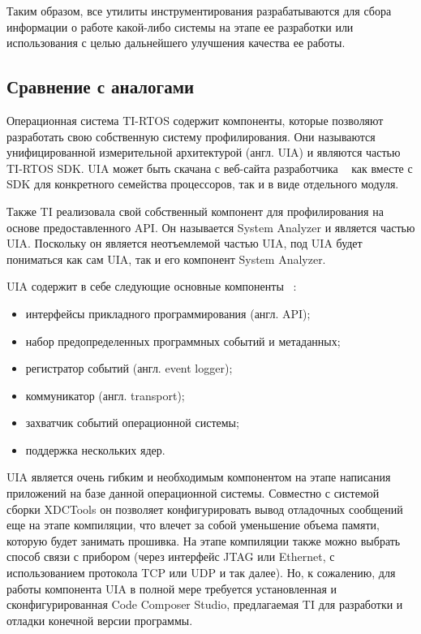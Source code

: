 Таким образом, все утилиты инструментирования разрабатываются для сбора
информации о работе какой-либо системы на этапе ее разработки или использования
с целью дальнейшего улучшения качества ее работы.

\subsection{Сравнение с аналогами}


Операционная система TI-RTOS содержит компоненты, которые позволяют
разработать свою собственную систему профилирования. Они называются
унифицированной измерительной архитектурой (англ. UIA) и являются частью
TI-RTOS SDK. UIA может быть скачана с веб-сайта разработчика ~\cite{uia_wiki}
как вместе с SDK для конкретного семейства процессоров, так и в виде отдельного
модуля.

Также TI реализовала свой собственный компонент для профилирования
на основе предоставленного API.
Он называется System Analyzer и является частью UIA.
Поскольку он является неотъемлемой частью UIA, под UIA будет пониматься
как сам UIA, так и его компонент System Analyzer.

UIA содержит в себе следующие основные компоненты ~\cite{sys_analyzer_doc}:
\begin{itemize}
    \item интерфейсы прикладного программирования (англ. API);
    \item набор предопределенных программных событий и метаданных;
    \item регистратор событий (англ. event logger);
    \item коммуникатор (англ. transport);
    \item захватчик событий операционной системы;
    \item поддержка нескольких ядер.
\end{itemize}


UIA является очень гибким и необходимым компонентом на этапе написания
приложений на базе данной операционной системы. Совместно с системой сборки
XDCTools он позволяет конфигурировать вывод отладочных сообщений еще на этапе
компиляции, что влечет за собой уменьшение объема памяти, которую будет
занимать прошивка. На этапе компиляции также можно выбрать способ связи с
прибором (через интерфейс JTAG или Ethernet, с использованием протокола TCP или
UDP и так далее). Но, к сожалению, для работы компонента UIA в полной мере
требуется установленная и сконфигурированная Code Composer Studio,
предлагаемая TI для разработки и отладки конечной версии программы.

